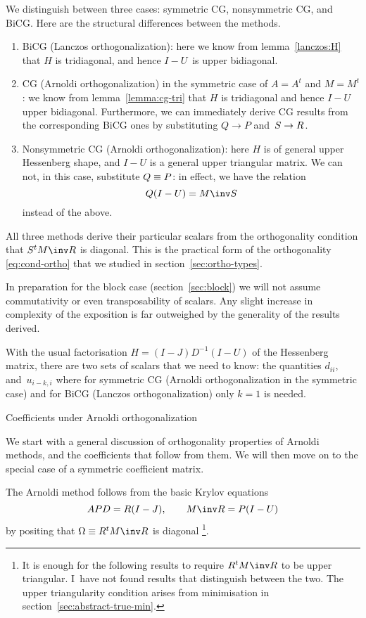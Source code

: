\documentclass[11pt]{artikel3}
\begin{document}
\begin{Outline}
We distinguish between three cases: symmetric CG, nonsymmetric CG, and
BiCG. Here are the structural differences between the methods.
\begin{enumerate}
\item BiCG (Lanczos orthogonalization):
here we know from lemma~\ref{lanczos:H} that $H$ is tridiagonal, and
hence $I-U$~is upper bidiagonal.
\item CG (Arnoldi orthogonalization)
in the symmetric case of $A=A^t$ and $M=M^t$:
we know from lemma~\ref{lemma:cg-tri}
that $H$ is tridiagonal and hence $I-U$ upper bidiagonal.
Furthermore, we can immediately derive CG results from the corresponding
BiCG ones by substituting $Q\rightarrow P$ and~$S\rightarrow\nobreak R$.
\item Nonsymmetric CG (Arnoldi orthogonalization):
here $H$ is of general upper Hessenberg shape,
and $I-U$ is a general upper triangular matrix.
We can not, in this case, substitute $Q\equiv\nobreak P$:
in effect, we have the
relation \[ Q(I-U) = M\inv S \] instead of the above.
\end{enumerate}

All three methods derive their particular scalars from the
orthogonality condition that $S^tM\inv R$ is diagonal. This is the
practical form of the orthogonality \eqref{eq:cond-ortho} that we
studied in section~\ref{sec:ortho-types}.

In preparation for the block case (section~\ref{sec:block})
we will not assume commutativity or even transposability of scalars. 
Any slight increase in complexity of the exposition is
far outweighed by the generality of the results derived.

With the usual factorisation $H=(I-J)D^{-1}(I-U)$ of the Hessenberg matrix,
there are two sets of scalars that we need to know: 
the quantities $d_{ii}$,
and~$u_{i-k,i}$ where for 
symmetric CG (Arnoldi orthogonalization in the symmetric case)
and for BiCG (Lanczos orthogonalization) only $k=1$ is needed.

 {Coefficients under Arnoldi orthogonalization}
\label{sec:arnoldi-minv}

We start with a general discussion of orthogonality properties of
Arnoldi methods, and the coefficients that follow from them. We will
then move on to the special case of a symmetric coefficient matrix.

The Arnoldi method follows from the basic Krylov equations
\[ APD=R(I-J),\qquad M\inv R=P(I-U) \]
by positing that $\Omega\equiv R^tM\inv R$ is diagonal%
\footnote{It is enough for the
following results to require $R^tM\inv R$ to be upper triangular.
I~have not found results that distinguish between the two.
The upper triangularity condition arises from minimisation
in section~\ref{sec:abstract-true-min}.}.


\end{Outline}
\end{document}
